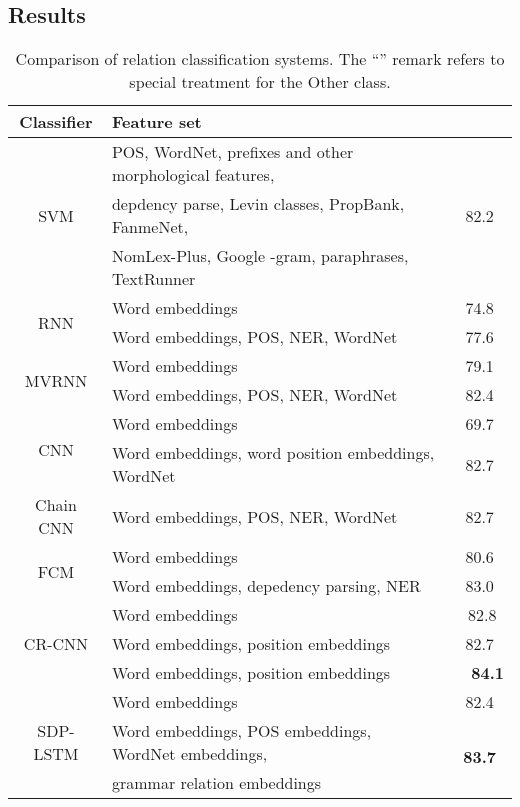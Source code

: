 \documentclass[11pt,a4paper]{article}
\begin{document}
\subsection{Results}\label{ssResult}

\begin{table*}[!t]
\centering
\begin{tabular}{c|l|c}
\hline
\hline
\textbf{Classifier} &\centering \textbf{Feature set} &\textbf{}\\
\hline
\multirow{3}{*}{SVM}                & POS, WordNet, prefixes and other morphological features, & \multirow{3}{*}{82.2}\\
                   & depdency parse, Levin classes, PropBank, FanmeNet,       &     \\
                   & NomLex-Plus, Google -gram, paraphrases, TextRunner    &     \\
\hline
\multirow{2}{*}{RNN}               & Word embeddings                                          & 74.8\\
                   & Word embeddings, POS, NER, WordNet                       & 77.6\\
\hline
\multirow{2}{*}{MVRNN}              & Word embeddings                                          & 79.1\\
                   & Word embeddings, POS, NER, WordNet                       & 82.4\\
\hline
\multirow{2}{*}{CNN}                &Word embeddings                                           & 69.7\\
                   &Word embeddings, word position embeddings, WordNet        & 82.7\\
\hline
Chain CNN & Word embeddings, POS, NER, WordNet  & 82.7\\
\hline
\multirow{2}{*}{FCM}                & Word embeddings                                         & 80.6\\
                    & Word embeddings, depedency parsing, NER                   & 83.0\\
\hline
\multirow{3}{*}{CR-CNN}              & Word embeddings             & \,\,82.8\\
& Word embeddings, position embeddings & 82.7 \\
                   & Word embeddings, position embeddings                      &\ \ \textbf{84.1}\\
\hline
\multirow{3}{*}{SDP-LSTM}          & Word embeddings                                           & 82.4\\
                    & Word embeddings, POS embeddings, WordNet embeddings,      &
                    \multirow{2}{*}{\textbf{83.7}}\\
                    & grammar relation embeddings                               & \\
\hline
\hline
\end{tabular}
\caption{Comparison of relation classification systems. The ``'' remark refers to
special treatment for the {\ttfamily Other} class.}
\end{table*}
\end{document}
